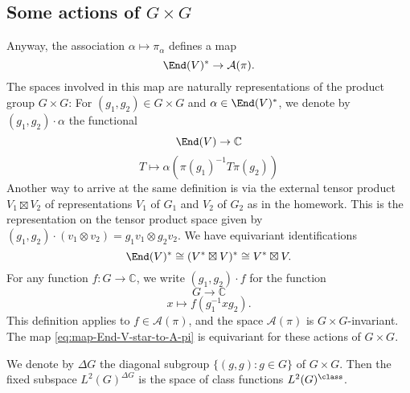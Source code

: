 \documentclass[reqno]{amsart} 
\begin{document}
\subsection{Some actions of \texorpdfstring{$G \times G$}{G x G}}\label{sec:cnh2vophjp}
Anyway, the association $\alpha \mapsto \pi_\alpha$ defines a map
\begin{equation}\label{eq:map-End-V-star-to-A-pi}
  \End(V)^* \rightarrow \mathcal{A}(\pi).
\end{equation}
The spaces involved in this map are naturally representations of the product group $G \times G$: For $(g_1,g_2) \in G \times G$ and $\alpha \in \End(V)^*$, we denote by $(g_1,g_2) \cdot \alpha$ the functional
\begin{equation*}
  \End(V) \rightarrow \mathbb{C}
\end{equation*}
\begin{equation*}
  T \mapsto \alpha(\pi(g_1)^{-1} T \pi(g_2))
\end{equation*}
Another way to arrive at the same definition is via the external tensor product $V_1 \boxtimes V_2$ of representations $V_1$ of $G_1$ and $V_2$ of $G_2$ as in the homework.  This is the representation on the tensor product space given by $(g_1,g_2) \cdot (v_1 \otimes v_2) = g_1 v_1 \otimes g_2 v_2$.  We have equivariant identifications
\begin{equation}\label{eq:identify-End-V-star}
  \End(V)^*
  \cong
  (V^* \boxtimes V)^*
  \cong
  V^* \boxtimes V.
\end{equation}
For any function $f : G \rightarrow \mathbb{C}$, we write $(g_1,g_2) \cdot f$ for the function
\begin{equation*}
  G \rightarrow \mathbb{C}
\end{equation*}
\begin{equation*}
  x \mapsto f(g_1^{-1} x g_2).
\end{equation*}
This definition applies to $f \in \mathcal{A}(\pi)$, and the space $\mathcal{A}(\pi)$ is $G \times G$-invariant.  The map \eqref{eq:map-End-V-star-to-A-pi} is equivariant for these actions of $G \times G$.

We denote by $\Delta G$ the diagonal subgroup $\{(g,g) : g \in G\}$ of $G \times G$.  Then the fixed subspace $L^2(G)^{\Delta G}$ is the space of class functions $L^2(G)^{\class}$.
\end{document}
